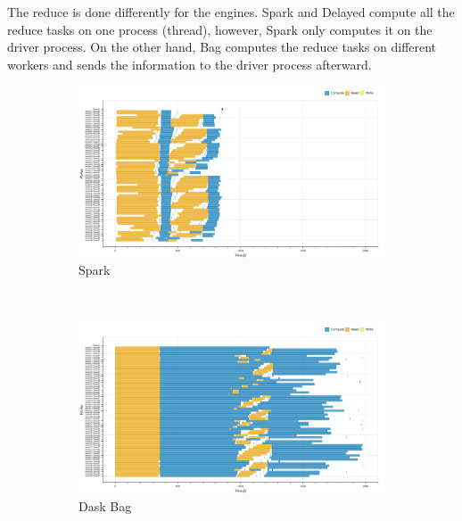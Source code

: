 \documentclass[conference]{IEEEtran}
\begin{document}
The reduce is done differently for the engines. Spark and Delayed compute
all the reduce tasks on one process (thread), however, Spark only computes it
on the driver process. On the other hand, Bag computes the reduce tasks on 
different workers and sends the information to the driver process afterward.

\begin{figure}[!t]
    \centering
    \begin{subfigure}[b]{\columnwidth}
        \includegraphics[clip,width=\columnwidth,
        height=0.15\textheight]{images/spark_histo_gantt.png}
        \caption{Spark}\label{fig:histo_spark_gantt}
    \end{subfigure}
    \\
    \begin{subfigure}[b]{\columnwidth}
        \includegraphics[clip,width=\columnwidth,
        height=0.15\textheight]{images/bag_histo_gantt.png}%
        \caption{Dask Bag}\label{fig:histo_dask_bag_gantt}
    \end{subfigure}
    \\
    \begin{subfigure}[b]{\columnwidth}

\end{subfigure}
\end{figure}
\end{document}
